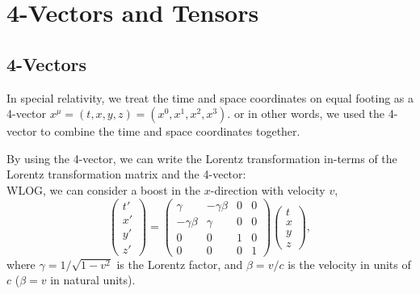 \newpage
\section{4-Vectors and Tensors}

\subsection{4-Vectors}
\begin{foundation}
  In special relativity, we treat the time and space coordinates on equal footing as a 4-vector $x^\mu = (t, x, y, z) = (x^0, x^1, x^2, x^3)$.
  or in other words, we used the 4-vector to combine the time and space coordinates together.
\end{foundation}

\begin{theory}
  By using the 4-vector, we can write the Lorentz transformation in-terms of the Lorentz transformation matrix and the 4-vector: \\
  \smallskip\noindent
  WLOG, we can consider a boost in the $x$-direction with velocity $v$,
  \[
    \begin{pmatrix}t' \\ x' \\ y' \\ z'
    \end{pmatrix}
    = \begin{pmatrix}
      \gamma & -\gamma \beta & 0 & 0 \\
      -\gamma \beta & \gamma & 0 & 0 \\
      0 & 0 & 1 & 0 \\
      0 & 0 & 0 & 1
    \end{pmatrix}
    \begin{pmatrix}t \\ x \\ y \\ z
    \end{pmatrix},
  \]
  where $\gamma = 1/\sqrt{1-v^2}$ is the Lorentz factor, and $\beta = v/c$ is the velocity in units of $c$ ($\beta = v$ in natural units).
\end{theory}

\bigskip\noindent
